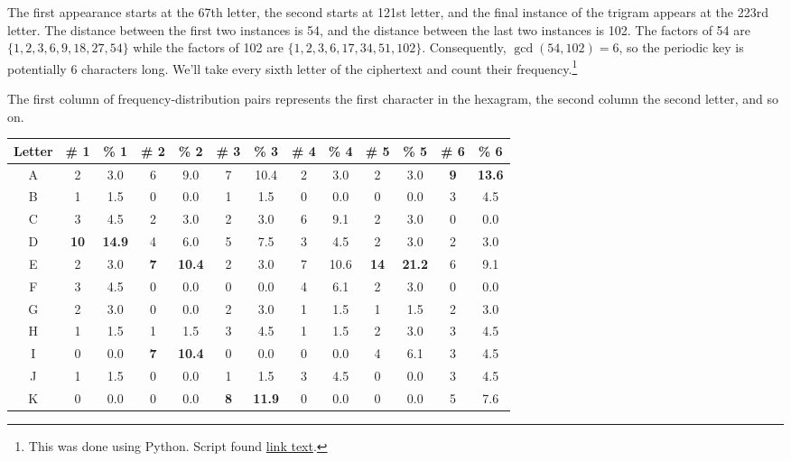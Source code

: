 \documentclass[12pt]{article}
\theoremstyle{remark}  %
\begin{document}
    The first appearance starts at the 67th letter, the second starts at 121st letter, and the final instance of the trigram appears at the 223rd letter. The distance between the first two instances is 54, and the distance between the last two instances is 102. The factors of 54 are $\{1, 2, 3, 6, 9, 18, 27, 54\}$ while the factors of 102 are $\{1, 2, 3, 6, 17, 34, 51, 102\}$. Consequently, $\gcd(54, 102)=6$, so the periodic key is potentially 6 characters long. We'll take every sixth letter of the ciphertext and count their frequency.\footnote{This was done using Python. Script found \hyperlink{target name}{link text}.} \par The first column of frequency-distribution pairs represents the first character in the hexagram, the second column the second letter, and so on.
    \begin{table}[h]
        \begin{center}
            \begin{tabular}{c|cc|cc|cc|cc|cc|cc|}
                Letter & \# 1 & \% 1 & \# 2 & \% 2 & \# 3 & \% 3 & \# 4 & \% 4 & \# 5 & \% 5 & \# 6 & \% 6 \\
                \hline
                A & 2 & 3.0 & 6 & 9.0 & 7 & 10.4 & 2 & 3.0 & 2 & 3.0 & \textbf{9} & \textbf{13.6} \\
                B & 1 & 1.5 & 0 & 0.0 & 1 & 1.5 & 0 & 0.0 & 0 & 0.0 & 3 & 4.5 \\
                C & 3 & 4.5 & 2 & 3.0 & 2 & 3.0 & 6 & 9.1 & 2 & 3.0 & 0 & 0.0 \\
                D & \textbf{10} & \textbf{14.9} & 4 & 6.0 & 5 & 7.5 & 3 & 4.5 & 2 & 3.0 & 2 & 3.0 \\
                E & 2 & 3.0 & \textbf{7} & \textbf{10.4} & 2 & 3.0 & 7 & 10.6 & \textbf{14} & \textbf{21.2} & 6 & 9.1 \\
                F & 3 & 4.5 & 0 & 0.0 & 0 & 0.0 & 4 & 6.1 & 2 & 3.0 & 0 & 0.0 \\
                G & 2 & 3.0 & 0 & 0.0 & 2 & 3.0 & 1 & 1.5 & 1 & 1.5 & 2 & 3.0 \\
                H & 1 & 1.5 & 1 & 1.5 & 3 & 4.5 & 1 & 1.5 & 2 & 3.0 & 3 & 4.5 \\
                I & 0 & 0.0 & \textbf{7} & \textbf{10.4} & 0 & 0.0 & 0 & 0.0 & 4 & 6.1 & 3 & 4.5 \\
                J & 1 & 1.5 & 0 & 0.0 & 1 & 1.5 & 3 & 4.5 & 0 & 0.0 & 3 & 4.5 \\
                K & 0 & 0.0 & 0 & 0.0 & \textbf{8} & \textbf{11.9} & 0 & 0.0 & 0 & 0.0 & 5 & 7.6 \\

\end{tabular}
\end{center}
\end{table}
\end{document}
